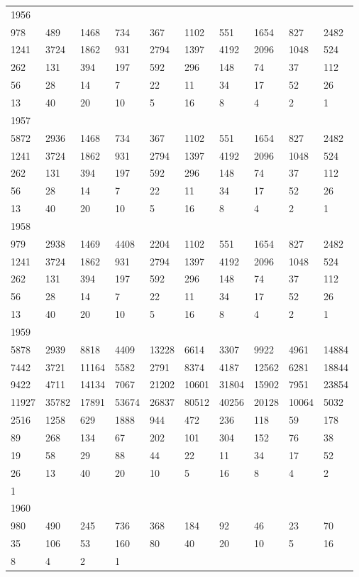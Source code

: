 \begin{longtable}{*{10}{l}}
1956&&&&&&&&&\\
978& 489& 1468& 734& 367& 1102& 551& 1654& 827& 2482\\
1241& 3724& 1862& 931& 2794& 1397& 4192& 2096& 1048& 524\\
262& 131& 394& 197& 592& 296& 148& 74& 37& 112\\
56& 28& 14& 7& 22& 11& 34& 17& 52& 26\\
13& 40& 20& 10& 5& 16& 8& 4& 2& 1\\

1957&&&&&&&&&\\
5872& 2936& 1468& 734& 367& 1102& 551& 1654& 827& 2482\\
1241& 3724& 1862& 931& 2794& 1397& 4192& 2096& 1048& 524\\
262& 131& 394& 197& 592& 296& 148& 74& 37& 112\\
56& 28& 14& 7& 22& 11& 34& 17& 52& 26\\
13& 40& 20& 10& 5& 16& 8& 4& 2& 1\\

1958&&&&&&&&&\\
979& 2938& 1469& 4408& 2204& 1102& 551& 1654& 827& 2482\\
1241& 3724& 1862& 931& 2794& 1397& 4192& 2096& 1048& 524\\
262& 131& 394& 197& 592& 296& 148& 74& 37& 112\\
56& 28& 14& 7& 22& 11& 34& 17& 52& 26\\
13& 40& 20& 10& 5& 16& 8& 4& 2& 1\\

1959&&&&&&&&&\\
5878& 2939& 8818& 4409& 13228& 6614& 3307& 9922& 4961& 14884\\
7442& 3721& 11164& 5582& 2791& 8374& 4187& 12562& 6281& 18844\\
9422& 4711& 14134& 7067& 21202& 10601& 31804& 15902& 7951& 23854\\
11927& 35782& 17891& 53674& 26837& 80512& 40256& 20128& 10064& 5032\\
2516& 1258& 629& 1888& 944& 472& 236& 118& 59& 178\\
89& 268& 134& 67& 202& 101& 304& 152& 76& 38\\
19& 58& 29& 88& 44& 22& 11& 34& 17& 52\\
26& 13& 40& 20& 10& 5& 16& 8& 4& 2\\
1& \\

1960&&&&&&&&&\\
980& 490& 245& 736& 368& 184& 92& 46& 23& 70\\
35& 106& 53& 160& 80& 40& 20& 10& 5& 16\\
8& 4& 2& 1& \\


\end{longtable}

